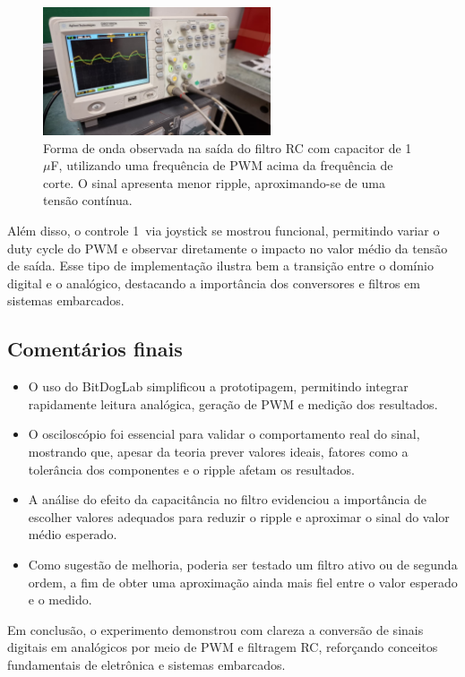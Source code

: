 \documentclass{article}
\begin{document}
\begin{figure}
    \centering
    \includegraphics[width=0.6\textwidth]{fig/1uF.jpeg}
    \caption{Forma de onda observada na saída do filtro RC com capacitor de 1~$\mu$F, utilizando uma frequência de PWM acima da frequência de corte. O sinal apresenta menor ripple, aproximando-se de uma tensão contínua.}
    \label{fig:1uF}
\end{figure}


Além disso, o controle 1~via joystick se mostrou funcional, permitindo variar o duty cycle do PWM e observar diretamente o impacto no valor médio da tensão de saída. Esse tipo de implementação ilustra bem a transição entre o domínio digital e o analógico, destacando a importância dos conversores e filtros em sistemas embarcados.

\subsection*{Comentários finais}
\begin{itemize}
    \item O uso do BitDogLab simplificou a prototipagem, permitindo integrar rapidamente leitura analógica, geração de PWM e medição dos resultados.
    \item O osciloscópio foi essencial para validar o comportamento real do sinal, mostrando que, apesar da teoria prever valores ideais, fatores como a tolerância dos componentes e o ripple afetam os resultados.
    \item A análise do efeito da capacitância no filtro evidenciou a importância de escolher valores adequados para reduzir o ripple e aproximar o sinal do valor médio esperado.
    \item Como sugestão de melhoria, poderia ser testado um filtro ativo ou de segunda ordem, a fim de obter uma aproximação ainda mais fiel entre o valor esperado e o medido.
\end{itemize}

Em conclusão, o experimento demonstrou com clareza a conversão de sinais digitais em analógicos por meio de PWM e filtragem RC, reforçando conceitos fundamentais de eletrônica e sistemas embarcados.
\end{document}
